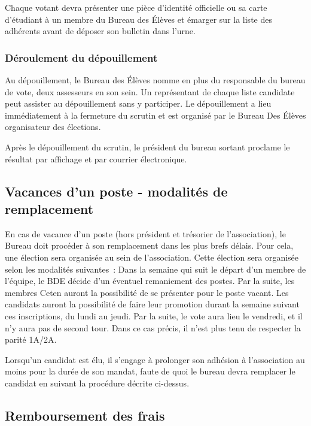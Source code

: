 \documentclass{article} %
\begin{document}
				Chaque votant devra présenter une pièce d’identité officielle ou
				sa carte d’étudiant à un membre du Bureau des Élèves et émarger
				sur la liste des adhérents avant de déposer son bulletin dans
				l’urne.

			\subsubsection{Déroulement du dépouillement}

				Au dépouillement, le Bureau des Élèves nomme en plus du
				responsable du bureau de vote, deux assesseurs en son sein. Un
				représentant de chaque liste candidate peut assister au
				dépouillement sans y participer. Le dépouillement a lieu
				immédiatement à la fermeture du scrutin et est organisé par le
				Bureau Des Élèves organisateur des élections.

				Après le dépouillement du scrutin, le président du bureau
				sortant proclame le résultat par affichage et par courrier
				électronique.

		\subsection{Vacances d’un poste - modalités de remplacement}

			En cas de vacance d'un poste (hors président et trésorier de
			l’association), le Bureau doit procéder à son remplacement dans les
			plus brefs délais. Pour cela, une élection sera organisée au sein de
			l'association. Cette élection sera organisée selon les modalités
			suivantes : Dans la semaine qui suit le départ d’un membre de
			l’équipe, le BDE décide d’un éventuel remaniement des postes. Par la
			suite, les membres Ceten auront la possibilité de se présenter pour
			le poste vacant. Les candidats auront la possibilité de faire leur
			promotion durant la semaine suivant ces inscriptions, du lundi au
			jeudi. Par la suite, le vote aura lieu le vendredi, et il n’y aura
			pas de second tour. Dans ce cas précis, il n’est plus tenu de
			respecter la parité 1A/2A.
			
			Lorsqu’un candidat est élu, il s’engage à prolonger son adhésion
			à l’association au moins pour la durée de son mandat, faute de
			quoi le bureau devra remplacer le candidat en suivant
			la procédure décrite ci-dessus.

		\subsection{Remboursement des frais}
\end{document}
